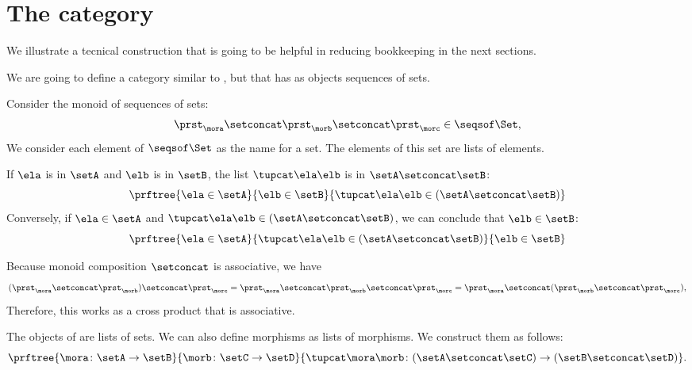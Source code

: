 \section{The \SetStar category}
\label{sec:SetStar}

We illustrate a tecnical construction that is going to be helpful in reducing bookkeeping in the next sections.

We are going to define a category similar to \Set, but that has as objects sequences of sets. 

Consider the monoid of sequences of sets:
%
\begin{equation}
    \label{eq:sets-monoid}
    \prst_{\mora} \setconcat \prst_{\morb} \setconcat \prst_{\morc} \in \seqsof\Set,
\end{equation}
%
We consider each element of $\seqsof\Set$ as the name for a set. The elements of this set are lists of elements.

If $\ela$ is in $\setA$ and $\elb$ is in $\setB$, the list $\tupcat \ela \elb$ is in $\setA \setconcat \setB$:
%
\begin{equation}
    \label{eq:sets-monoid-axiom1}
    \prftree{\ela \in \setA}{\elb \in \setB}{ \tupcat \ela \elb \in (\setA \setconcat \setB) }
\end{equation}
%
Conversely, if $\ela \in \setA$ and $\tupcat \ela \elb \in (\setA \setconcat \setB)$, we can conclude that $\elb \in \setB$:
% 
\begin{equation}
    \label{eq:sets-monoid-axiom2}
    \prftree{\ela \in \setA}{ \tupcat \ela \elb \in (\setA \setconcat \setB) }{  \elb \in  \setB }
\end{equation}


Because monoid composition $\setconcat$ is associative, we have
%
\begin{equation}
    \label{eq:sets-monoid-comp}
    (\prst_{\mora} \setconcat \prst_{\morb} )\setconcat \prst_{\morc} =
    \prst_{\mora} \setconcat \prst_{\morb} \setconcat \prst_{\morc} =
    \prst_{\mora} \setconcat (\prst_{\morb} \setconcat \prst_{\morc}),
\end{equation}
%
Therefore, this works as a cross product that is associative.

The objects of \SetStar are lists of sets. 
We can also define morphisms as lists of morphisms. 
We construct them as follows:  
% 
\begin{equation}
    \label{eq:sets-monoid-maps2}
    \prftree{ \mora \colon \setA \to \setB}{ \morb \colon \setC \to \setD}{ \tupcat \mora \morb \colon (\setA \setconcat \setC)\to (\setB \setconcat \setD)}.
\end{equation}

